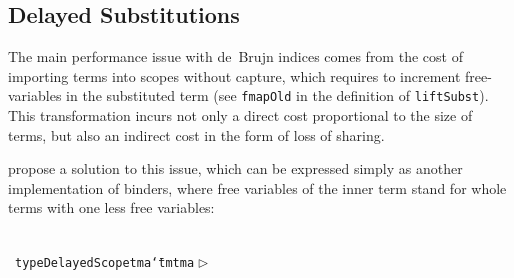 \documentclass[9pt,preprint,authoryear]{sigplanconf}
\begin{document}
%
%


\subsection{Delayed Substitutions}

%
The main performance issue with de{~}Brujn indices comes from the cost of importing
    terms into scopes without capture, which requires to increment
    free-variables in the substituted term (see \textcolor[rgb]{0,0,0.80}{\texttt{fmap}}\textcolor[rgb]{0,0,0.80}{\texttt{\mbox{\hspace{0.50em}}}}\textcolor[rgb]{0.70,0.13,0.13}{\texttt{Old}} in the definition of \textcolor[rgb]{0,0,0.80}{\texttt{liftSubst}}). 
    This transformation incurs not only a direct cost proportional to the size of terms,
    but also an indirect cost in the form of loss of sharing.%


%
 propose a solution to this issue, which can be expressed
     simply as another implementation of binders, where free variables of the inner term stand for 
     whole terms with one less free variables{:}%


{\nopagebreak }

%
%
%
~\\~\vphantom{$\{$}\textcolor[cmyk]{0,0.65,0.99,0}{\texttt{type}}\textcolor[rgb]{0,0,0.80}{\texttt{\mbox{\hspace{0.50em}}}}\textcolor[rgb]{0,0,0.80}{\texttt{DelayedScope}}\textcolor[rgb]{0,0,0.80}{\texttt{\mbox{\hspace{0.50em}}}}\textcolor[rgb]{0,0,0.80}{\texttt{tm}}\textcolor[rgb]{0,0,0.80}{\texttt{\mbox{\hspace{0.50em}}}}\textcolor[rgb]{0,0,0.80}{\texttt{a}}\textcolor[rgb]{0,0,0.80}{\texttt{\mbox{\hspace{0.50em}}}}\textcolor[cmyk]{0,0.65,0.99,0}{\texttt{{\char `\=}}}\textcolor[rgb]{0,0,0.80}{\texttt{\mbox{\hspace{0.50em}}}}\textcolor[rgb]{0,0,0.80}{\texttt{tm}}\textcolor[rgb]{0,0,0.80}{\texttt{\mbox{\hspace{0.50em}}}}\textcolor[cmyk]{0,0.65,0.99,0}{\texttt{\makebox[1.22ex][l]{$ {(} $}}}\textcolor[rgb]{0,0,0.80}{\texttt{tm}}\textcolor[rgb]{0,0,0.80}{\texttt{\mbox{\hspace{0.50em}}}}\textcolor[rgb]{0,0,0.80}{\texttt{a}}\textcolor[rgb]{0,0,0.80}{\texttt{\mbox{\hspace{0.50em}}}}\textcolor[rgb]{0,0,0.80}{\texttt{$ \vartriangleright $}}\textcolor[rgb]{0,0,0.80}{\texttt{\mbox{\hspace{0.50em}}}}\textcolor[cmyk]{0,0.65,0.99,0}{\texttt{\makebox[1.22ex][l]{$ {(} $}}}\textcolor[cmyk]{0,0.65,0.99,0}{\texttt{\makebox[1.22ex][r]{$ {)} $}}}\textcolor[cmyk]{0,0.65,0.99,0}{\texttt{\makebox[1.22ex][r]{$ {)} $}}}\textcolor[rgb]{0,0,0.80}{\texttt{{\nopagebreak \newline%
}\vphantom{$\{$}}}%
\end{document}
